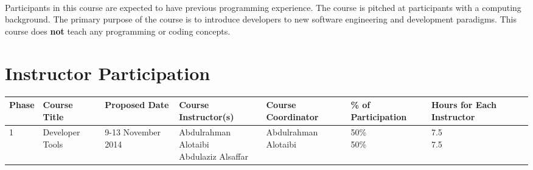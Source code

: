 \documentclass[a4paper,11pt]{article}
\begin{document}
\paragraph{}
Participants in this course are expected to have previous programming experience. The course is pitched at participants with a computing background. The primary purpose of the course is to introduce developers to new software engineering and development paradigms. This course does \textbf{not} teach any programming or coding concepts.

\pagebreak
\pagestyle{landscape}
\section{Instructor Participation}
\begin{center}
	\begin{tabular}{|l|l|l|l|l|l|l|}
		\hline
			\textbf{Phase} & 
			\textbf{Course Title} & 
			\textbf{Proposed Date} & 
			\textbf{Course Instructor(s)} & 
			\textbf{Course Coordinator} & 
			\textbf{\% of Participation} & 
			\textbf{Hours for Each Instructor} \\
		\hline
			1 & 
			Developer Tools & 
			9-13 November 2014 & 
			\parbox[c]{0.33\textwidth}{Abdulrahman Alotaibi\\Abdulaziz Alsa{f}far} & 
			Abdulrahman Alotaibi & 
			\parbox[c]{0.33\textwidth}{50\%\\50\%} & 
			\parbox[c]{0.33\textwidth}{7.5\\7.5} \\
		\hline
	\end{tabular}
\end{center}
\end{document}
